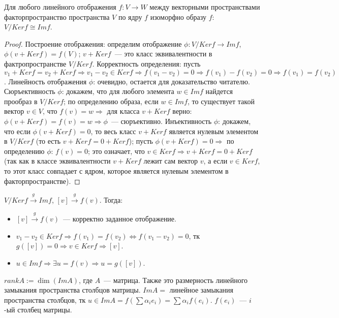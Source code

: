 \documentclass{article}
\begin{document}
	\begin{theorem}
		Для любого линейного отображения $f: V \rightarrow W$ между векторными пространствами факторпространство пространства $V$ по ядру $f$ изоморфно образу $f$: $V / Ker f \cong Im f$.
	\end{theorem}
	\begin{proof}
		 Построение отображения: определим отображение $\phi: V / Ker f \rightarrow Im f$, $\phi (v + Ker f) = f(V)$; $v + Ker f$~--- это класс эквивалентности в фактропространстве $V / Ker f$. Корректность определения: пусть $v_1 + Ker f = v_2 + Ker f \Rightarrow v_1 - v_2 \in Ker f \Rightarrow f(v_1 - v_2) = 0 \Rightarrow f(v_1) - f(v_2) = 0 \Rightarrow f(v_1) = f(v_2)$. Линейность отображения $\phi$: очевидно, остается для доказательство читателю. Сюръективность $\phi$: докажем, что для любого элемента $w \in Im f$ найдется прообраз в $V / Ker f$; по определению образа, если $w \in Im f$, то существует такой вектор $v \in V$, что $f(v) = w \Rightarrow$ для класса $v + Ker f$ верно: $\phi (v + Ker f) = f(v) = w \Rightarrow \phi$~--- сюръективно. Инъективность $\phi$: докажем, что если $\phi (v + Ker f) = 0$, то весь класс $v + Ker f$ является нулевым элементом в $V / Ker f$ (то есть $v + Ker f = 0 + Ker f$); пусть $\phi (v + Ker f) = 0 \Rightarrow$ по определению $\phi$: $f(v) = 0$; это означает, что $v \in Ker f \Rightarrow v + Ker f = 0 + Ker f$ (так как в классе эквивалентности $v + Ker f$ лежит сам вектор $v$, а если $v \in Ker f$, то этот класс совпадает с ядром, которое является нулевым элементом в факторпространстве).
	\end{proof}
	\begin{statement}
		$V / Ker f \xrightarrow{g} Im f$, $[v] \xrightarrow{g} f(v)$. Тогда:
		\begin{itemize}
			\item $[v] \xrightarrow{g} f(v)$~--- корректно заданное отображение.
			\item $v_1 - v_2 \in Ker f \Rightarrow f(v_1) = f(v_2) \Leftrightarrow f(v_1 - v_2) = 0$, тк $g([v]) = 0 \Rightarrow v \in Ker f \Rightarrow [v]$.
			\item $u \in Im f \Rightarrow \exists u = f(v) \Rightarrow u = g([v])$.
		\end{itemize}
	\end{statement}
	\begin{definition}
		$rank A := \dim(Im A)$, где $A$~--- матрица. Также это размерность линейного замыкания пространства столбцов матрицы. $Im A = $ линейное замыкания пространства столбцов, тк $u \in Im A = f(\sum \alpha_i e_i) = \sum \alpha_i f(e_i)$. $f(e_i)$~--- $i$-ый столбец матрицы.
	\end{definition}
\end{document}
